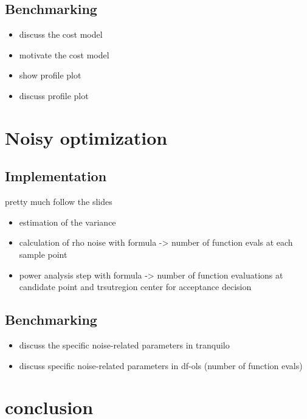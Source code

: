 \subsection{Benchmarking}
\begin{itemize}
    \item discuss the cost model
    \item motivate the cost model
    \item show profile plot
    \item discuss profile plot
\end{itemize}

\section{Noisy optimization}

\subsection{Implementation}
pretty much follow the slides
\begin{itemize}
    \item estimation of the variance
    \item calculation of rho noise with formula -> number of function evals at each sample point
    \item power analysis step with formula -> number of function evaluations at candidate point and trsutregion center for acceptance decision
\end{itemize}
\subsection{Benchmarking}
\begin{itemize}
    \item discuss the specific noise-related parameters in tranquilo
    \item discuss specific noise-related parameters in df-ols (number of function evals)
\end{itemize}

\section{conclusion}
